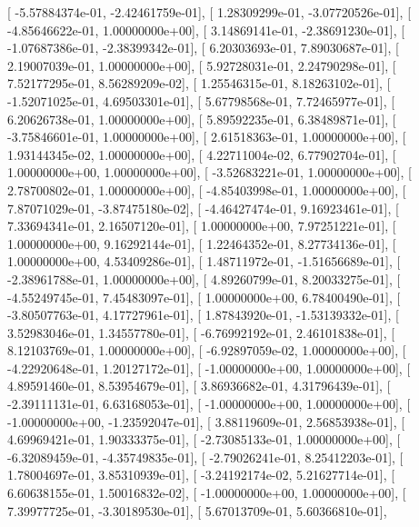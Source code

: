 \documentclass{article}
\begin{document}
       [ -5.57884374e-01,  -2.42461759e-01],
       [  1.28309299e-01,  -3.07720526e-01],
       [ -4.85646622e-01,   1.00000000e+00],
       [  3.14869141e-01,  -2.38691230e-01],
       [ -1.07687386e-01,  -2.38399342e-01],
       [  6.20303693e-01,   7.89030687e-01],
       [  2.19007039e-01,   1.00000000e+00],
       [  5.92728031e-01,   2.24790298e-01],
       [  7.52177295e-01,   8.56289209e-02],
       [  1.25546315e-01,   8.18263102e-01],
       [ -1.52071025e-01,   4.69503301e-01],
       [  5.67798568e-01,   7.72465977e-01],
       [  6.20626738e-01,   1.00000000e+00],
       [  5.89592235e-01,   6.38489871e-01],
       [ -3.75846601e-01,   1.00000000e+00],
       [  2.61518363e-01,   1.00000000e+00],
       [  1.93144345e-02,   1.00000000e+00],
       [  4.22711004e-02,   6.77902704e-01],
       [  1.00000000e+00,   1.00000000e+00],
       [ -3.52683221e-01,   1.00000000e+00],
       [  2.78700802e-01,   1.00000000e+00],
       [ -4.85403998e-01,   1.00000000e+00],
       [  7.87071029e-01,  -3.87475180e-02],
       [ -4.46427474e-01,   9.16923461e-01],
       [  7.33694341e-01,   2.16507120e-01],
       [  1.00000000e+00,   7.97251221e-01],
       [  1.00000000e+00,   9.16292144e-01],
       [  1.22464352e-01,   8.27734136e-01],
       [  1.00000000e+00,   4.53409286e-01],
       [  1.48711972e-01,  -1.51656689e-01],
       [ -2.38961788e-01,   1.00000000e+00],
       [  4.89260799e-01,   8.20033275e-01],
       [ -4.55249745e-01,   7.45483097e-01],
       [  1.00000000e+00,   6.78400490e-01],
       [ -3.80507763e-01,   4.17727961e-01],
       [  1.87843920e-01,  -1.53139332e-01],
       [  3.52983046e-01,   1.34557780e-01],
       [ -6.76992192e-01,   2.46101838e-01],
       [  8.12103769e-01,   1.00000000e+00],
       [ -6.92897059e-02,   1.00000000e+00],
       [ -4.22920648e-01,   1.20127172e-01],
       [ -1.00000000e+00,   1.00000000e+00],
       [  4.89591460e-01,   8.53954679e-01],
       [  3.86936682e-01,   4.31796439e-01],
       [ -2.39111131e-01,   6.63168053e-01],
       [ -1.00000000e+00,   1.00000000e+00],
       [ -1.00000000e+00,  -1.23592047e-01],
       [  3.88119609e-01,   2.56853938e-01],
       [  4.69969421e-01,   1.90333375e-01],
       [ -2.73085133e-01,   1.00000000e+00],
       [ -6.32089459e-01,  -4.35749835e-01],
       [ -2.79026241e-01,   8.25412203e-01],
       [  1.78004697e-01,   3.85310939e-01],
       [ -3.24192174e-02,   5.21627714e-01],
       [  6.60638155e-01,   1.50016832e-02],
       [ -1.00000000e+00,   1.00000000e+00],
       [  7.39977725e-01,  -3.30189530e-01],
       [  5.67013709e-01,   5.60366810e-01],
\end{document}
